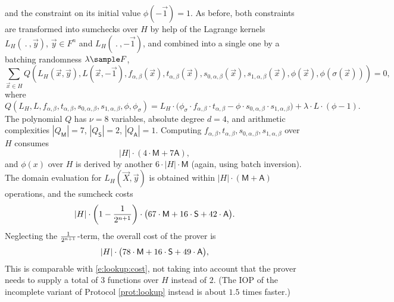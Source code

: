 \documentclass[11pt]{article}
\theoremstyle{definition}
\theoremstyle{remark}
\begin{document}
and the constraint on its initial value $\phi(-\vec 1) = 1$.
As before, both constraints are transformed into sumchecks over $H$ by help of the Lagrange kernels $L_H(\:.\:, \vec y)$, $\vec y\in F^n$ and $L_H(\:.\:, -\vec 1)$, and combined into a single one by a batching randomness $\lambda\sample F$,
\[
\sum_{\vec x\in H} Q(L_H(\vec x, \vec y), L(\vec x, -\vec 1), f_{\alpha,\beta}(\vec x) , t_{\alpha,\beta}(\vec x), s_{0,\alpha,\beta}(\vec x),s_{1,\alpha,\beta}(\vec x), \phi(\vec x), \phi(\sigma(\vec x))) = 0,
\]
where
\begin{equation*}
Q(L_H, L,   f_{\alpha,\beta} , t_{\alpha,\beta}, s_{0,\alpha,\beta}, s_{1,\alpha,\beta}, \phi, \phi_\sigma) 
= L_H \cdot \Big(\phi_\sigma \cdot f_{\alpha,\beta}\cdot t_{\alpha,\beta} 
- \phi \cdot s_{0,\alpha,\beta} \cdot s_{1,\alpha,\beta}\Big)
+ \lambda\cdot L \cdot (\phi - 1). 
\end{equation*}
The polynomial $Q$ has $\nu= 8$ variables, absolute degree $d=4$, and arithmetic complexities $|Q_\mathsf M|= 7$, $|Q_\mathsf S|= 2$, $|Q_\mathsf A|= 1$. 
Computing $f_{\alpha,\beta}, t_{\alpha,\beta}, s_{0,\alpha,\beta}, s_{1,\alpha,\beta}$ over $H$ consumes 
\[
|H|\cdot (4\cdot \mathsf M + 7 \mathsf A),
\]
and $\phi(x)$ over $H$ is derived by another $6\cdot |H|\cdot \mathsf M$ (again, using batch inversion). 
The domain evaluation for $L_H(\vec X, \vec y)$ is obtained within $|H|\cdot (\mathsf M + \mathsf A)$ operations, and the sumcheck costs
\begin{equation*}
|H| \cdot \left(1-\frac{1}{2^{n+1}}\right)\cdot \big(67 \cdot\textsf M +  16\cdot\textsf S + 42 \cdot \textsf A\big).
\end{equation*}
Neglecting the $\nicefrac{1}{2^{n+1}}$-term, the overall cost of the prover is 
\begin{equation}
\label{e:lookup:hyperplonk:cost}
|H| \cdot \big(78\cdot\textsf M +  16\cdot\textsf S + 49 \cdot \textsf A\big),
\end{equation}
This is comparable with \eqref{e:lookup:cost}, not taking into account that the prover needs to supply a total of $3$ functions over $H$ instead of $2$. 
(The IOP of the incomplete variant of Protocol \ref{prot:lookup} instead is about $1.5$ times faster.)
\end{document}
